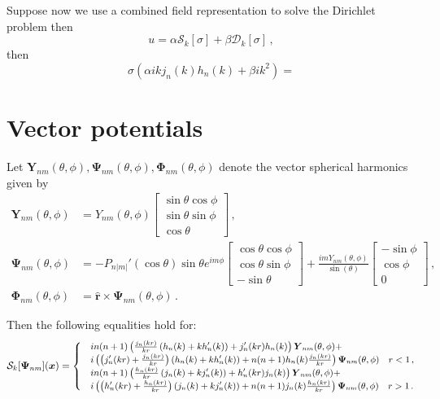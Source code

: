 \documentclass[11pt]{article}
\newcommand\br{\boldsymbol r}
\newcommand\bx{\boldsymbol x}
\newcommand\bY{\boldsymbol Y}
\newcommand\bPhi{\boldsymbol \Phi}
\newcommand\bPsi{\boldsymbol \Psi}
\newcommand\cS{\mathcal{S}}
\newcommand\cD{\mathcal{D}}
\theoremstyle{definition}
\theoremstyle{remark}
\numberwithin{equation}{section}
\begin{document}
Suppose now we use a combined field representation to solve the Dirichlet problem then 
\begin{equation}
u = \alpha \cS_{k}[\sigma] + \beta \cD_{k}[\sigma] \, ,
\end{equation}
then
\begin{equation}
\sigma (\alpha ik j_{n}(k) h_{n}(k) + \beta ik^2 ) = 
\end{equation}

\section*{Vector potentials}
Let $\bY_{nm}(\theta,\phi), \bPsi_{nm}(\theta,\phi), \bPhi_{nm}(\theta,\phi)$ denote the vector spherical harmonics given by
\begin{equation}
\begin{aligned}
\bY_{nm}(\theta,\phi) &= 
Y_{nm}(\theta,\phi)\begin{bmatrix}
\sin{\theta} \cos{\phi} \\
\sin{\theta} \sin{\phi} \\
\cos{\theta} 
\end{bmatrix} \, , \\
\bPsi_{nm}(\theta,\phi) &= 
-P_{n|m|}'(\cos{\theta}) \sin{\theta} e^{im\phi}\begin{bmatrix}
\cos{\theta} \cos{\phi} \\
\cos{\theta} \sin{\phi} \\
-\sin{\theta} 
\end{bmatrix}
+
\frac{imY_{nm}(\theta,\phi)}{\sin(\theta)}
\begin{bmatrix}
-\sin{\phi} \\
\cos{\phi} \\
0
\end{bmatrix} \, ,\\
\bPhi_{nm}(\theta,\phi) &= \hat{\br} \times \bPsi_{nm}(\theta,\phi) \, .
\end{aligned}
\end{equation} 


 Then the following equalities hold for:
\begin{equation}
\cS_{k}[\bPsi_{nm}](\bx) = 
{\small
\begin{cases}
&i n(n+1) \left( \frac{j_{n}(kr)}{kr} \left( h_{n}(k) + kh_{n}'(k) \right) + j_{n}'(kr) h_{n}(k) \right) \bY_{nm}(\theta,\phi) + \\
& i\left(  \left(j_{n}'(kr) + \frac{j_{n}(kr)}{kr}\right) \left( h_{n}(k) + kh_{n}'(k) \right) + n(n+1)h_{n}(k)\frac{j_{n}(kr)}{kr} \right) \bPsi_{nm}(\theta,\phi) \quad r<1 \, , \\
&i n(n+1) \left( \frac{h_{n}(kr)}{kr} \left( j_{n}(k) + kj_{n}'(k) \right) + h_{n}'(kr) j_{n}(k) \right) \bY_{nm}(\theta,\phi) + \\
& i\left(  \left(h_{n}'(kr) + \frac{h_{n}(kr)}{kr}\right) \left( j_{n}(k) + kj_{n}'(k) \right) + n(n+1)j_{n}(k)\frac{h_{n}(kr)}{kr} \right) \bPsi_{nm}(\theta,\phi) \quad r>1 \, .
\end{cases}}
\end{equation}
\end{document}
